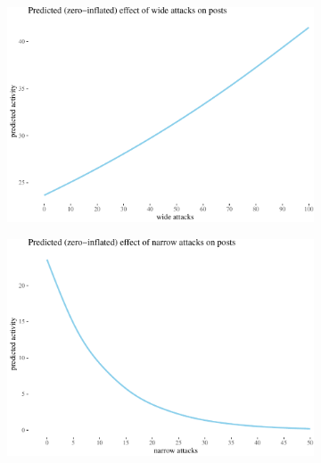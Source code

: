 \documentclass[10pt,]{scrartcl}
\begin{document}
\begin{figure}
\begin{subfigure}[b]{0.45\textwidth}

\begin{center}\includegraphics[width=1\linewidth]{redditAnalysisWalkthrough_files/figure-latex/unnamed-chunk-105-1} \end{center}
\end{subfigure}
\hfill
\begin{subfigure}[b]{0.45\textwidth}

\begin{center}\includegraphics[width=1\linewidth]{redditAnalysisWalkthrough_files/figure-latex/unnamed-chunk-106-1} \end{center}
\end{subfigure}

\centering
\begin{subfigure}[t]{0.45\textwidth}


\end{subfigure}
\end{figure}
\end{document}
